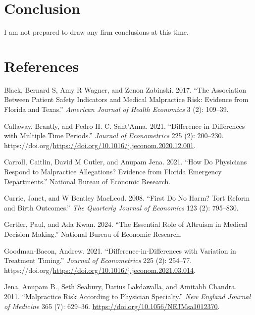 \documentclass[
  12pt,
]{article}
\newlength{\cslhangindent}
\newlength{\cslentryspacingunit} %
\newenvironment{CSLReferences}[2] %
 {%
  \setlength{\parindent}{0pt}
  \ifodd #1
  \let\oldpar\par
  \def\par{\hangindent=\cslhangindent\oldpar}
  \fi
  \setlength{\parskip}{#2\cslentryspacingunit}
 }%
 {}
\begin{document}
\hypertarget{conclusion}{%
\section{Conclusion}\label{conclusion}}

I am not prepared to draw any firm conclusions at this time.

\hypertarget{references}{%
\section{References}\label{references}}

\hypertarget{refs}{}
\begin{CSLReferences}{1}{0}
\leavevmode{}%
Black, Bernard S, Amy R Wagner, and Zenon Zabinski. 2017. {``The Association Between Patient Safety Indicators and Medical Malpractice Risk: Evidence from Florida and Texas.''} \emph{American Journal of Health Economics} 3 (2): 109--39.

\leavevmode{}%
Callaway, Brantly, and Pedro H. C. Sant'Anna. 2021. {``Difference-in-Differences with Multiple Time Periods.''} \emph{Journal of Econometrics} 225 (2): 200--230. https://doi.org/\url{https://doi.org/10.1016/j.jeconom.2020.12.001}.

\leavevmode{}%
Carroll, Caitlin, David M Cutler, and Anupam Jena. 2021. {``How Do Physicians Respond to Malpractice Allegations? Evidence from Florida Emergency Departments.''} National Bureau of Economic Research.

\leavevmode{}%
Currie, Janet, and W Bentley MacLeod. 2008. {``First Do No Harm? Tort Reform and Birth Outcomes.''} \emph{The Quarterly Journal of Economics} 123 (2): 795--830.

\leavevmode{}%
Gertler, Paul, and Ada Kwan. 2024. {``The Essential Role of Altruism in Medical Decision Making.''} National Bureau of Economic Research.

\leavevmode{}%
Goodman-Bacon, Andrew. 2021. {``Difference-in-Differences with Variation in Treatment Timing.''} \emph{Journal of Econometrics} 225 (2): 254--77. https://doi.org/\url{https://doi.org/10.1016/j.jeconom.2021.03.014}.

\leavevmode{}%
Jena, Anupam B., Seth Seabury, Darius Lakdawalla, and Amitabh Chandra. 2011. {``Malpractice Risk According to Physician Specialty.''} \emph{New England Journal of Medicine} 365 (7): 629--36. \url{https://doi.org/10.1056/NEJMsa1012370}.


\end{CSLReferences}
\end{document}
